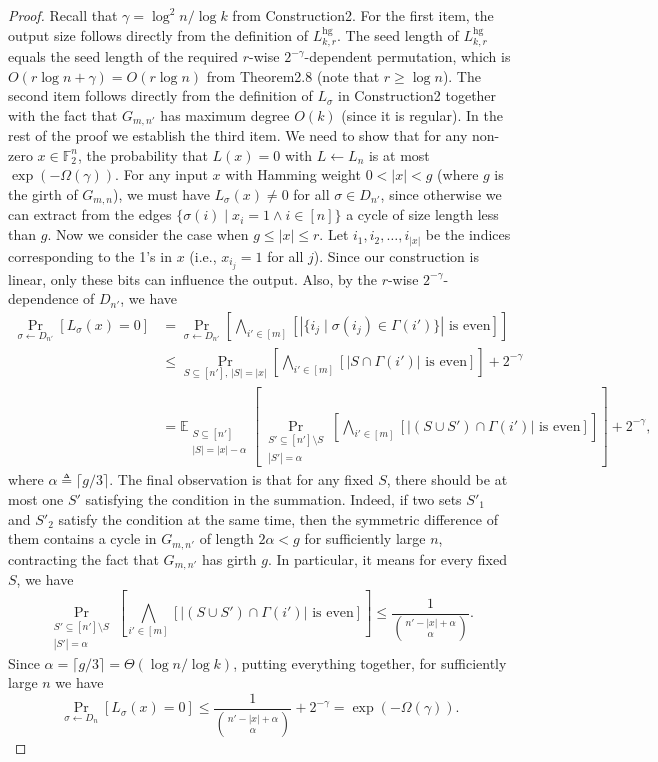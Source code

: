 \begin{proof}
Recall that $\gamma=\log^2n/\log k$ from Construction2. For the first item, the output size follows directly from the definition of $L^{\mathrm{hg}}_{k,r}$. The seed length of $L^{\mathrm{hg}}_{k,r}$ equals the seed length of the required $r$-wise $2^{-\gamma}$-dependent permutation, which is $O(r\log n+\gamma)=O(r\log n)$ from Theorem2.8 (note that $r\ge\log n$). The second item follows directly from the definition of $L_\sigma$ in Construction2 together with the fact that $G_{m,n'}$ has maximum degree $O(k)$ (since it is regular).
In the rest of the proof we establish the third item. We need to show that for any non-zero $x\in\mathbb F_2^n$, the probability that $L(x)=0$ with $L\leftarrow L_n$ is at most $\exp(-\Omega(\gamma))$. For any input $x$ with Hamming weight $0<|x|<g$ (where $g$ is the girth of $G_{m,n}$), we must have $L_\sigma(x)\ne0$ for all $\sigma\in D_{n'}$, since otherwise we can extract from the edges $\{\sigma(i)\mid x_i=1\wedge i\in[n]\}$ a cycle of size length less than $g$. Now we consider the case when $g\le|x|\le r$. Let $i_1,i_2,\ldots,i_{|x|}$ be the indices corresponding to the 1's in $x$ (i.e., $x_{i_j}=1$ for all $j$). Since our construction is linear, only these bits can influence the output. Also, by the $r$-wise $2^{-\gamma}$-dependence of $D_{n'}$, we have
\begin{align*}
\Pr_{\sigma\leftarrow D_{n'}}[L_\sigma(x)=0]
&=\Pr_{\sigma\leftarrow D_{n'}}\left[\bigwedge_{i'\in[m]}[|\{i_j\mid\sigma(i_j)\in\Gamma(i')\}|\text{ is even}]\right]\\
&\le\Pr_{S\subseteq[n'],\,|S|=|x|}\left[\bigwedge_{i'\in[m]}[|S\cap\Gamma(i')|\text{ is even}]\right]+2^{-\gamma}\\
&=\mathbb E_{\substack{S\subseteq[n']\\|S|=|x|-\alpha}}\left[\Pr_{\substack{S'\subseteq[n']\setminus S\\|S'|=\alpha}}\left[\bigwedge_{i'\in[m]}[|(S\cup S')\cap\Gamma(i')|\text{ is even}]\right]\right]+2^{-\gamma},
\end{align*}
where $\alpha\triangleq\lceil g/3\rceil$.
The final observation is that for any fixed $S$, there should be at most one $S'$ satisfying the condition in the summation. Indeed, if two sets $S'_1$ and $S'_2$ satisfy the condition at the same time, then the symmetric difference of them contains a cycle in $G_{m,n'}$ of length $2\alpha<g$ for sufficiently large $n$, contracting the fact that $G_{m,n'}$ has girth $g$. In particular, it means for every fixed $S$, we have
\[\Pr_{\substack{S'\subseteq[n']\setminus S\\|S'|=\alpha}}\left[\bigwedge_{i'\in[m]}[|(S\cup S')\cap\Gamma(i')|\text{ is even}]\right]\le\frac1{\binom{n'-|x|+\alpha}{\alpha}}.\]
Since $\alpha=\lceil g/3\rceil=\Theta(\log n/\log k)$, putting everything together, for sufficiently large $n$ we have
\[\Pr_{\sigma\leftarrow D_n}[L_\sigma(x)=0]\le\frac1{\binom{n'-|x|+\alpha}{\alpha}}+2^{-\gamma}=\exp(-\Omega(\gamma)).\]
\end{proof}
